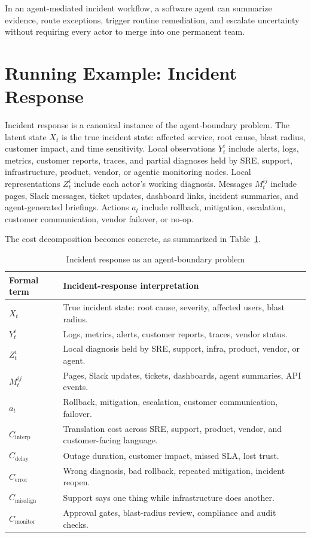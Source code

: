 \documentclass[11pt]{article}
\begin{document}
In an agent-mediated incident workflow, a software agent can summarize evidence,
route exceptions, trigger routine remediation, and escalate uncertainty without
requiring every actor to merge into one permanent team.

\section{Running Example: Incident Response}

Incident response is a canonical instance of the agent-boundary problem. The
latent state \(X_t\) is the true incident state: affected service, root cause,
blast radius, customer impact, and time sensitivity. Local observations
\(Y_t^i\) include alerts, logs, metrics, customer reports, traces, and partial
diagnoses held by SRE, support, infrastructure, product, vendor, or agentic
monitoring nodes. Local representations \(Z_t^i\) include each actor's working
diagnosis. Messages \(M_t^{ij}\) include pages, Slack messages, ticket updates,
dashboard links, incident summaries, and agent-generated briefings. Actions
\(a_t\) include rollback, mitigation, escalation, customer communication,
vendor failover, or no-op.

The cost decomposition becomes concrete, as summarized in
Table~\ref{tab:incident}.

\begin{table}[H]
\centering
\caption{Incident response as an agent-boundary problem}
\label{tab:incident}
\begin{tabularx}{\textwidth}{@{}lX@{}}
\toprule
Formal term & Incident-response interpretation \\
\midrule
\(X_t\) & True incident state: root cause, severity, affected users, blast radius. \\
\(Y_t^i\) & Logs, metrics, alerts, customer reports, traces, vendor status. \\
\(Z_t^i\) & Local diagnosis held by SRE, support, infra, product, vendor, or agent. \\
\(M_t^{ij}\) & Pages, Slack updates, tickets, dashboards, agent summaries, API events. \\
\(a_t\) & Rollback, mitigation, escalation, customer communication, failover. \\
\(C_{\mathrm{interp}}\) & Translation cost across SRE, support, product, vendor, and customer-facing language. \\
\(C_{\mathrm{delay}}\) & Outage duration, customer impact, missed SLA, lost trust. \\
\(C_{\mathrm{error}}\) & Wrong diagnosis, bad rollback, repeated mitigation, incident reopen. \\
\(C_{\mathrm{misalign}}\) & Support says one thing while infrastructure does another. \\
\(C_{\mathrm{monitor}}\) & Approval gates, blast-radius review, compliance and audit checks. \\
\bottomrule
\end{tabularx}
\end{table}
\end{document}
